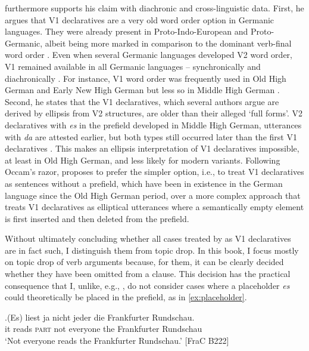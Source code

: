 \largerpage
\citet{oennerfors1997} furthermore supports his claim with diachronic and cross\hyp linguistic data.
First, he argues that V1 declaratives are a very old word order option in Germanic languages.
They were already present in Proto-Indo-European and Proto-Germanic, albeit being more marked in comparison to the dominant verb-final word order \citep[8]{oennerfors1997}.
Even when several Germanic languages developed V2 word order, V1 remained available in all Germanic languages -- synchronically and diachronically \citep[9]{oennerfors1997}.
For instance, V1 word order was frequently used in Old High German and Early New High German but less so in Middle High German \citep[10]{oennerfors1997}.
Second, he states that the V1 declaratives, which several authors argue are derived by ellipsis from V2 structures, are older than their alleged `full forms'.
V2 declaratives with \textit{es} in the prefield developed in Middle High German, utterances with \textit{da} are attested earlier, but both types still occurred later than the first V1 declaratives \citep[52]{oennerfors1997}.
This makes an ellipsis interpretation of V1 declaratives impossible, at least in Old High German, and less likely for modern variants.
Following Occam's razor, \citet[52]{oennerfors1997} proposes to prefer the simpler option, i.e., to treat V1 declaratives as sentences without a prefield, which have been in existence in the German language since the Old High German period, over a more complex approach that treats V1 declaratives as elliptical utterances where a semantically empty element is first inserted and then deleted from the prefield.

Without ultimately concluding whether all cases treated by \citet{oennerfors1997} as V1 declaratives are in fact such, I distinguish them from topic drop.
In this book, I focus mostly on topic drop of verb arguments  because, for them, it can be clearly decided whether they have been omitted from a clause.
This decision has the practical consequence that I, unlike, e.g., \citet{frick2017}, do not consider cases where a placeholder \textit{es} could theoretically be placed in the prefield, as in \ref{ex:placeholder}.

\exg.\label{ex:placeholder}(Es) liest ja nicht jeder die Frankfurter Rundschau.\\
it reads \textsc{part} not everyone the Frankfurter Rundschau\\
`Not everyone reads the Frankfurter Rundschau.' [FraC B222]


